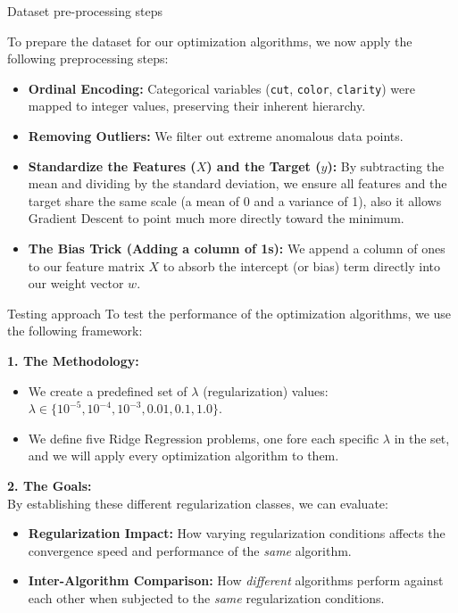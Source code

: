 \documentclass[10pt]{beamer}
\begin{document}
\begin{frame}{Dataset pre-processing steps}
    
    To prepare the dataset for our optimization algorithms, we now apply the following preprocessing steps:
    \vspace{0.2cm}

    \begin{itemize}
        \item \textbf{Ordinal Encoding:} Categorical variables (\texttt{cut}, \texttt{color}, \texttt{clarity}) were mapped to integer values, preserving their inherent hierarchy. 
        \item \textbf{Removing Outliers:} We filter out extreme anomalous data points.
        \item \textbf{Standardize the Features ($X$) and the Target ($y$):} By subtracting the mean and dividing by the standard deviation, we ensure all features and the target share the same scale (a mean of 0 and a variance of 1), also it allows Gradient Descent to point much more directly toward the minimum.
        \item \textbf{The Bias Trick (Adding a column of 1s):} We append a column of ones to our feature matrix $X$ to absorb the intercept (or bias) term directly into our weight vector $w$.
    \end{itemize}
\end{frame}

\begin{frame}{Testing approach}
    To test the performance of the optimization algorithms, we use the following framework:

    \vspace{0.4cm}
    \textbf{1. The Methodology:}
    \begin{itemize}
        \item We create a predefined set of $\lambda$ (regularization) values: $\lambda \in \{10^{-5}, 10^{-4}, 10^{-3}, 0.01, 0.1, 1.0\}$.
        \item We define five Ridge Regression problems, one fore each specific $\lambda$ in the set, and we will apply every optimization algorithm to them.
    \end{itemize}

    \vspace{0.4cm}
    \textbf{2. The Goals:} \\
    By establishing these different regularization classes, we can evaluate:
    \begin{itemize}
        \item \textbf{Regularization Impact:} How varying regularization conditions affects the convergence speed and performance of the \textit{same} algorithm.
        \item \textbf{Inter-Algorithm Comparison:} How \textit{different} algorithms perform against each other when subjected to the \textit{same} regularization conditions.
    \end{itemize}
\end{frame}
\end{document}
